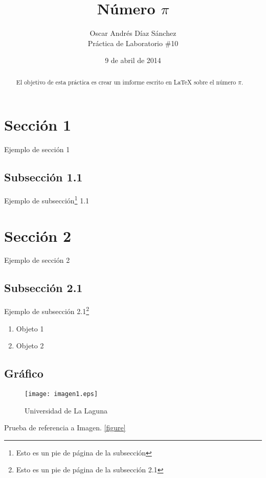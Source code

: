 \documentclass[spanish,a4paper,10pt]{article}
\begin{document}
\title{Número $\pi$}
\author{Oscar Andrés Díaz Sánchez \\ Práctica de Laboratorio \#10}
\date{9 de abril de 2014}

\maketitle

\begin{abstract}
El objetivo de esta práctica es crear un imforme escrito en \LaTeX{}
sobre el número $\pi$.
\end{abstract}

\section{Sección 1}

Ejemplo de sección 1
%
\subsection{Subsección 1.1}
Ejemplo de subsección\footnote{Esto es un pie de página de la subsección} 1.1
%

\section{Sección 2}

Ejemplo de sección 2
%
\subsection{Subsección 2.1}
Ejemplo de subsección 2.1\footnote{Esto es un pie de página de la subsección 2.1}

\begin{enumerate}
  \item
    Objeto 1
  \item
    Objeto 2
\end{enumerate}

\subsection{Gráfico}
\begin{figure}[h]
\begin{center}
\texttt{[image: imagen1.eps]} \end{center}
\caption{Universidad de La Laguna}
\label{Imagen}
\end{figure}
Prueba de referencia a Imagen. \ref{figure}
\end{document}
